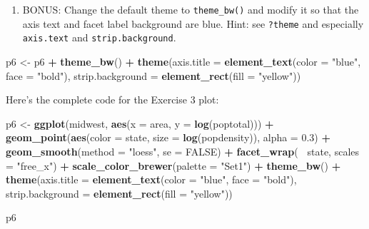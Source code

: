 \documentclass[]{book}
\newenvironment{Shaded}{\begin{snugshade}}{\end{snugshade}}
\newcommand{\DataTypeTok}[1]{\textcolor[rgb]{0.13,0.29,0.53}{#1}}
\newcommand{\FloatTok}[1]{\textcolor[rgb]{0.00,0.00,0.81}{#1}}
\newcommand{\KeywordTok}[1]{\textcolor[rgb]{0.13,0.29,0.53}{\textbf{#1}}}
\newcommand{\NormalTok}[1]{#1}
\newcommand{\OperatorTok}[1]{\textcolor[rgb]{0.81,0.36,0.00}{\textbf{#1}}}
\newcommand{\OtherTok}[1]{\textcolor[rgb]{0.56,0.35,0.01}{#1}}
\newcommand{\StringTok}[1]{\textcolor[rgb]{0.31,0.60,0.02}{#1}}
\providecommand{\tightlist}{%
  \setlength{\itemsep}{0pt}\setlength{\parskip}{0pt}}
\begin{document}
\begin{enumerate}
\def\labelenumi{\arabic{enumi}.}
\setcounter{enumi}{5}
\tightlist
\item
  BONUS: Change the default theme to \texttt{theme\_bw()} and modify it so that the axis text and facet label background are blue. Hint: see \texttt{?theme} and especially \texttt{axis.text} and \texttt{strip.background}.
\end{enumerate}

\begin{Shaded}
\begin{Highlighting}[]
\NormalTok{p6 <-}\StringTok{ }\NormalTok{p6 }\OperatorTok{+}\StringTok{ }\KeywordTok{theme_bw}\NormalTok{() }\OperatorTok{+}
\StringTok{    }\KeywordTok{theme}\NormalTok{(}\DataTypeTok{axis.title =} \KeywordTok{element_text}\NormalTok{(}\DataTypeTok{color =} \StringTok{"blue"}\NormalTok{, }\DataTypeTok{face =} \StringTok{"bold"}\NormalTok{),}
          \DataTypeTok{strip.background =} \KeywordTok{element_rect}\NormalTok{(}\DataTypeTok{fill =} \StringTok{"yellow"}\NormalTok{))}
\end{Highlighting}
\end{Shaded}

Here's the complete code for the Exercise 3 plot:

\begin{Shaded}
\begin{Highlighting}[]
\NormalTok{p6 <-}\StringTok{ }\KeywordTok{ggplot}\NormalTok{(midwest, }\KeywordTok{aes}\NormalTok{(}\DataTypeTok{x =}\NormalTok{ area, }\DataTypeTok{y =} \KeywordTok{log}\NormalTok{(poptotal))) }\OperatorTok{+}
\StringTok{    }\KeywordTok{geom_point}\NormalTok{(}\KeywordTok{aes}\NormalTok{(}\DataTypeTok{color =}\NormalTok{ state, }\DataTypeTok{size =} \KeywordTok{log}\NormalTok{(popdensity)), }\DataTypeTok{alpha =} \FloatTok{0.3}\NormalTok{) }\OperatorTok{+}
\StringTok{    }\KeywordTok{geom_smooth}\NormalTok{(}\DataTypeTok{method =} \StringTok{"loess"}\NormalTok{, }\DataTypeTok{se =} \OtherTok{FALSE}\NormalTok{) }\OperatorTok{+}
\StringTok{    }\KeywordTok{facet_wrap}\NormalTok{(}\OperatorTok{~}\StringTok{ }\NormalTok{state, }\DataTypeTok{scales =} \StringTok{"free_x"}\NormalTok{) }\OperatorTok{+}
\StringTok{    }\KeywordTok{scale_color_brewer}\NormalTok{(}\DataTypeTok{palette =} \StringTok{"Set1"}\NormalTok{) }\OperatorTok{+}
\StringTok{    }\KeywordTok{theme_bw}\NormalTok{() }\OperatorTok{+}
\StringTok{    }\KeywordTok{theme}\NormalTok{(}\DataTypeTok{axis.title =} \KeywordTok{element_text}\NormalTok{(}\DataTypeTok{color =} \StringTok{"blue"}\NormalTok{, }\DataTypeTok{face =} \StringTok{"bold"}\NormalTok{),}
         \DataTypeTok{strip.background =} \KeywordTok{element_rect}\NormalTok{(}\DataTypeTok{fill =} \StringTok{"yellow"}\NormalTok{))}

\NormalTok{p6         }
\end{Highlighting}
\end{Shaded}
\end{document}
